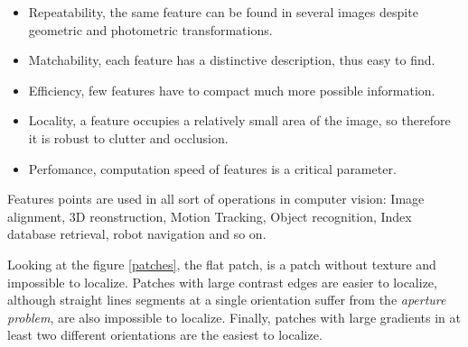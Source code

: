 \documentclass[12pt, a4paper, titlepage,twoside,openright]{article}
\begin{document}
\begin{itemize}

\item Repeatability, the same feature can be found in several images despite geometric and photometric transformations.

\item Matchability, each feature has a distinctive description, thus easy to find.

\item Efficiency, few features have to compact much more possible information.

\item Locality, a feature occupies a relatively small area of the image, so therefore it is robust to clutter and occlusion.

\item Perfomance, computation speed of features is a critical parameter. 

\end{itemize}

Features points are used in all sort of operations in computer vision: Image alignment, 3D reonstruction, Motion Tracking, Object recognition, Index database retrieval, robot navigation and so on.


Looking at the figure \ref{patches}, the flat patch, is a patch without texture and impossible to localize. Patches with large contrast edges are easier to localize, although straight lines segments at a single orientation suffer from the \textit{aperture problem}, are also impossible to localize. Finally, patches with large gradients in at least two different orientations are the easiest to localize.
\end{document}
